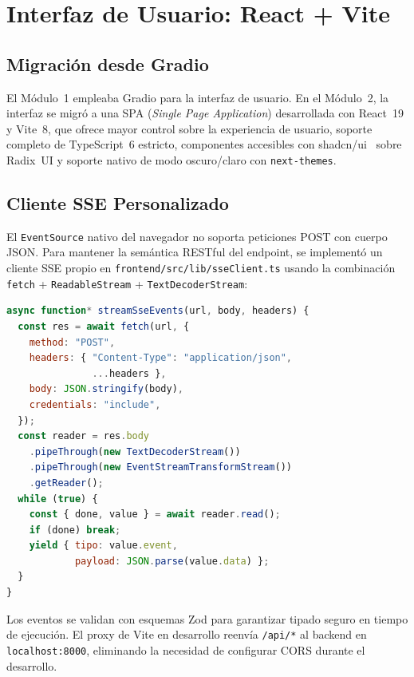 \documentclass[conference]{IEEEtran}
\newcommand{\code}[1]{\texttt{\small #1}}
\begin{document}
\section{Interfaz de Usuario: React + Vite}
\label{sec:frontend}

\subsection{Migración desde Gradio}

El Módulo~1 empleaba Gradio para la interfaz de usuario. En el Módulo~2, la
interfaz se migró a una SPA (\textit{Single Page Application}) desarrollada con
React~19 y Vite~8, que ofrece mayor control sobre la experiencia de usuario,
soporte completo de TypeScript~6 estricto, componentes accesibles con
shadcn/ui~\cite{shadcnui} sobre Radix~UI y soporte nativo de modo
oscuro/claro con \code{next-themes}.

\subsection{Cliente SSE Personalizado}

El \code{EventSource} nativo del navegador no soporta peticiones POST con cuerpo
JSON. Para mantener la semántica RESTful del endpoint, se implementó un cliente
SSE propio en \code{frontend/src/lib/sseClient.ts} usando la combinación
\code{fetch} + \code{ReadableStream} + \code{TextDecoderStream}:

\begin{lstlisting}[language=JavaScript,
    caption={Esquema del cliente SSE personalizado},
    label={lst:sse}]
async function* streamSseEvents(url, body, headers) {
  const res = await fetch(url, {
    method: "POST",
    headers: { "Content-Type": "application/json",
               ...headers },
    body: JSON.stringify(body),
    credentials: "include",
  });
  const reader = res.body
    .pipeThrough(new TextDecoderStream())
    .pipeThrough(new EventStreamTransformStream())
    .getReader();
  while (true) {
    const { done, value } = await reader.read();
    if (done) break;
    yield { tipo: value.event,
            payload: JSON.parse(value.data) };
  }
}
\end{lstlisting}

Los eventos se validan con esquemas Zod para garantizar tipado seguro en tiempo
de ejecución. El proxy de Vite en desarrollo reenvía \code{/api/*} al backend
en \code{localhost:8000}, eliminando la necesidad de configurar CORS durante
el desarrollo.
\end{document}
